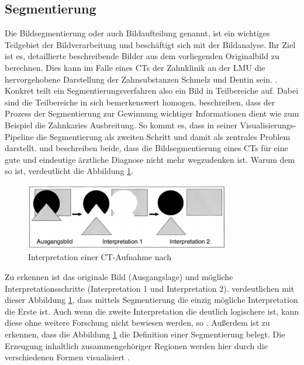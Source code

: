 \subsection{Segmentierung}
\label{subsec:segmentierung} Die Bildsegmentierung oder auch Bildaufteilung genannt,
ist ein wichtiges Teilgebiet der Bildverarbeitung und beschäftigt sich mit der
Bildanalyse. Ihr Ziel ist es, detaillierte beschreibende Bilder aus dem
vorliegenden Originalbild zu berechnen. Dies kann im Falle eines \ac{CT}s der Zahnklinik
an der \ac{LMU} die hervorgehobene Darstellung der Zahnsubstanzen Schmelz und
Dentin sein. \citep[vgl.][S.~359]{lehmann2013bildverarbeitung}. Konkret teilt ein
Segmentierungsverfahren also ein Bild in Teilbereiche auf. Dabei sind die
Teilbereiche in sich bemerkenswert homogen. \citet[S.~1]{ramesh2021} beschreiben,
dass der Prozess der Segmentierung zur Gewinnung wichtiger Informationen dient wie
zum Beispiel die Zahnkaries Ausbreitung. So kommt es, dass \citet[S.~50]{handels2000}
in seiner Visualisierungs-Pipeline die Segmentierung als zweiten Schritt und
damit als zentrales Problem darstellt. \citet[S.~95]{handels2000} und \citet[S.~360]{lehmann2013bildverarbeitung}
beschreiben beide, dass die Bildsegmentierung eines \ac{CT}s für eine gute und
eindeutige ärztliche Diagnose nicht mehr wegzudenken ist. Warum dem so ist,
verdeutlicht die Abbildung \ref{fig:interpretation_einer_ct_aufnahem}.

\begin{figure}[h]
	\centering
	\includegraphics[width=0.8\textwidth]{img/bild_interpretation.jpg}
	\caption{Interpretation einer CT-Aufnahme nach \citet[S.~360]{lehmann2013bildverarbeitung}}
	\label{fig:interpretation_einer_ct_aufnahem}
\end{figure}

Zu erkennen ist das originale Bild (Ausgangslage) und mögliche Interpretationsschritte
(Interpretation 1 und Interpretation 2). \citet[S.~360]{lehmann2013bildverarbeitung}
verdeutlichen mit dieser Abbildung \ref{fig:interpretation_einer_ct_aufnahem},
dass mittels Segmentierung die einzig mögliche Interpretation die Erste ist. Auch
wenn die zweite Interpretation die deutlich logischere ist, kann diese ohne
weitere Forschung nicht bewiesen werden, so \citet[S.~360]{lehmann2013bildverarbeitung}.
Außerdem ist zu erkennen, dass die Abbildung
\ref{fig:interpretation_einer_ct_aufnahem} die Definition einer Segmentierung
belegt. Die Erzeugung inhaltlich zusammengehöriger Regionen werden hier durch die
verschiedenen Formen visualisiert \citep[vgl.][S.~360]{lehmann2013bildverarbeitung}.

